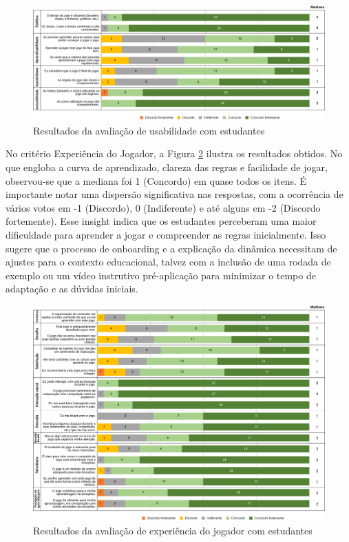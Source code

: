 \documentclass[
	12pt,
	openright,
	twoside,
	a4paper,
	english,
	brazil
	]{abntex2}
\begin{document}
\begin{figure}[H]
	\caption{\label{ufsc-usabilidade} Resultados da avaliação de usabilidade com estudantes}
  \includegraphics[width=\textwidth]{ufsc-usabilidade}
\end{figure}

No critério Experiência do Jogador, a Figura \ref{ufsc-xp-jogador} ilustra os resultados obtidos. No que engloba a curva de aprendizado, clareza das regras e facilidade de jogar, observou-se que a mediana foi 1 (Concordo) em quase todos os itens. É importante notar uma dispersão significativa nas respostas, com a ocorrência de vários votos em -1 (Discordo), 0 (Indiferente) e até alguns em -2 (Discordo fortemente). Esse insight indica que os estudantes perceberam uma maior dificuldade para aprender a jogar e compreender as regras inicialmente. Isso sugere que o processo de onboarding e a explicação da dinâmica necessitam de ajustes para o contexto educacional, talvez com a inclusão de uma rodada de exemplo ou um vídeo instrutivo pré-aplicação para minimizar o tempo de adaptação e as dúvidas iniciais.

\begin{figure}[H]
	\caption{\label{ufsc-xp-jogador} Resultados da avaliação de experiência do jogador com estudantes}
  \includegraphics[width=\textwidth]{ufsc-xp-jogador}
\end{figure}
\end{document}
